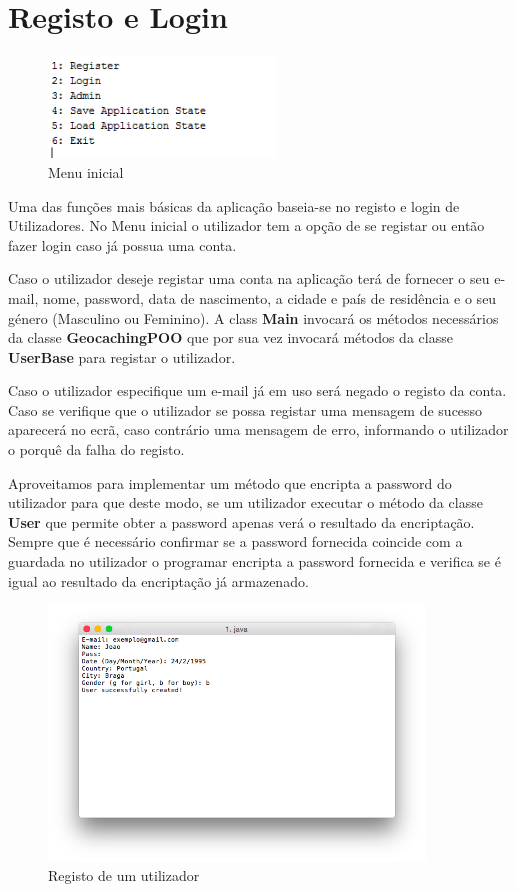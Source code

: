 \documentclass{article}
\begin{document}
\section{Registo e Login}
\begin{figure}[ht!]
\centering
\includegraphics[width=60mm]{menuprincipal.png}
\caption{Menu inicial}
\end{figure}
\par Uma das funções mais básicas da aplicação baseia-se no registo e login de Utilizadores. No Menu inicial o utilizador tem
a opção de se registar ou então fazer login caso já possua uma conta.
\par Caso o utilizador deseje registar uma conta na aplicação terá de fornecer o seu e-mail, nome, password,
data de nascimento, a cidade e país de residência e o seu género (Masculino ou Feminino). A class \textbf{Main} invocará
os métodos necessários da classe \textbf{GeocachingPOO} que por sua vez invocará métodos da classe
\textbf{UserBase} para registar o utilizador.
\par Caso o utilizador especifique um e-mail já em uso será negado o registo da conta. Caso se verifique que o utilizador se
possa registar uma mensagem de sucesso aparecerá no ecrã, caso contrário uma mensagem de erro, informando o utilizador
o porquê da falha do registo.
\par Aproveitamos para implementar um método que encripta a password do utilizador para que deste modo, se um utilizador 
executar o método da classe \textbf{User} que permite obter a password apenas verá o resultado da encriptação. 
Sempre que é necessário confirmar se a password fornecida coincide com a guardada no utilizador o programar encripta a password fornecida e verifica se é igual ao resultado da encriptação já armazenado.\\
\begin{figure}[ht!]
\centering
\includegraphics[width=100mm]{registo.png}
\caption{Registo de um utilizador}
\end{figure}
\end{document}
